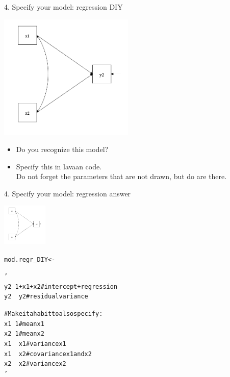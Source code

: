 \documentclass[10pt]{beamer}\usepackage[]{graphicx}\usepackage[]{xcolor}
\makeatletter
\newcommand{\hlstr}[1]{\textcolor[rgb]{0.192,0.494,0.8}{#1}}%
\newcommand{\hlstd}[1]{\textcolor[rgb]{0.345,0.345,0.345}{#1}}%
\newcommand{\hlkwb}[1]{\textcolor[rgb]{0.69,0.353,0.396}{#1}}%
\newenvironment{kframe}{%
 \def\at@end@of@kframe{}%
 \ifinner\ifhmode%
  \def\at@end@of@kframe{\end{minipage}}%
  \begin{minipage}{\columnwidth}%
 \fi\fi%
 \def\FrameCommand##1{\hskip\@totalleftmargin \hskip-\fboxsep
 \colorbox{shadecolor}{##1}\hskip-\fboxsep
     \hskip-\linewidth \hskip-\@totalleftmargin \hskip\columnwidth}%
 \MakeFramed {\advance\hsize-\width
   \@totalleftmargin\z@ \linewidth\hsize
   \@setminipage}}%
 {\par\unskip\endMakeFramed%
 \at@end@of@kframe}
\newenvironment{knitrout}{}{} %
\makeatother
\begin{document}
%
\begin{frame}[fragile]{4. Specify your model: regression DIY}

\includegraphics[height=6cm, keepaspectratio=T] {regression_DIY.png}

\begin{itemize}
  \item Do you recognize this model? 
  \item Specify this in lavaan code. \\
  Do not forget the parameters that are not drawn, but do are there.
\end{itemize}

\end{frame}
%
\begin{frame}[fragile]{4. Specify your model: regression answer}

\includegraphics[height=2cm, keepaspectratio=T] {regression_DIY.png} 

\begin{knitrout}
\color{fgcolor}\begin{kframe}
\begin{alltt}
\hlstd{mod.regr_DIY} \hlkwb{<-} \hlstr{'
  y2 ~ 1 + x1 + x2  # intercept + regression
  y2 ~~ y2          # residual variance
  
  # Make it a habit to also specify:
  x1 ~ 1            # mean x1 
  x2 ~ 1            # mean x2 
  x1 ~~ x1          # variance x1 
  x1 ~~ x2          # covariance x1 and x2
  x2 ~~ x2          # variance x2
'}
\end{alltt}
\end{kframe}
\end{knitrout}

\end{frame}
\end{document}
